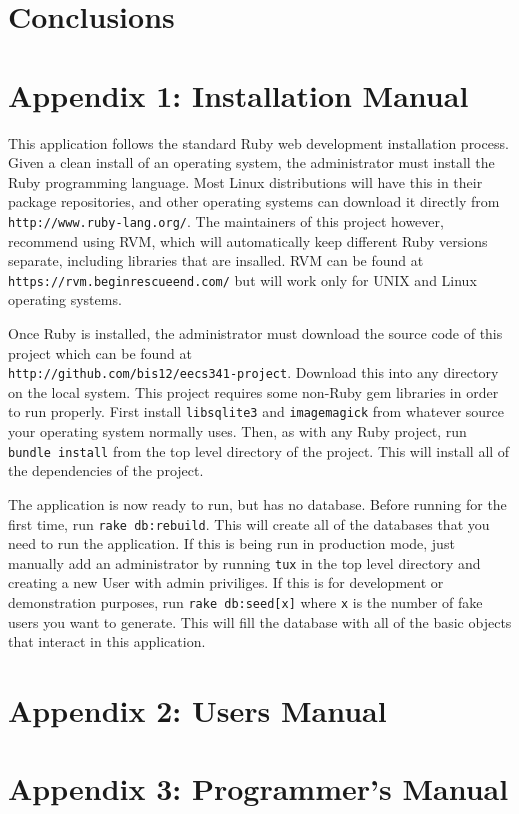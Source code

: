 \documentclass{acm_proc_article-sp}
\begin{document}

\section{Conclusions}
\section{Appendix 1: Installation Manual}
This application follows the standard Ruby web development installation process.  Given a clean install of an operating system, the administrator must install the Ruby programming language. Most Linux distributions will have this in their package repositories, and other operating systems can download it directly from \texttt{http://www.ruby-lang.org/}.  The maintainers of this project however, recommend using RVM, which will automatically keep different Ruby versions separate, including libraries that are insalled. RVM can be found at \texttt{https://rvm.beginrescueend.com/} but will work only for UNIX and Linux operating systems.  

Once Ruby is installed, the administrator must download the source code of this project which can be found at \\\texttt{http://github.com/bis12/eecs341-project}.  Download this into any directory on the local system.  This project requires some non-Ruby gem libraries in order to run properly.  First install \texttt{libsqlite3} and \texttt{imagemagick} from whatever source your operating system normally uses. Then, as with any Ruby project, run \texttt{bundle install} from the top level directory of the project. This will install all of the dependencies of the project.

The application is now ready to run, but has no database.  Before running for the first time,  run \texttt{rake db:rebuild}. This will create all of the databases that you need to run the application.  If this is being run in production mode, just manually add an administrator by running \texttt{tux} in the top level directory and creating a new User with admin priviliges.  If this is for development or demonstration purposes, run \texttt{rake db:seed[x]} where \texttt{x} is the number of fake users you want to generate.  This will fill the database with all of the basic objects that interact in this application.
\section{Appendix 2: Users Manual}
\section{Appendix 3: Programmer's Manual}
\end{document}
